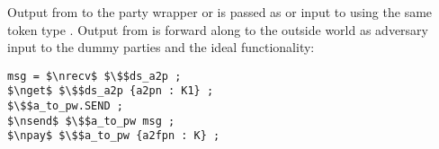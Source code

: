Output from \A to the party wrapper or \F is passed as  or  input to \DS using the same token type .
Output from \DS is forward along to the outside world as adversary input to the dummy parties and the ideal functionality:
\begin{lstlisting}[basicstyle=\footnotesize\BeraMonottFamily, frame=single, mathescape]
msg = $\nrecv$ $\$$ds_a2p ;
$\nget$ $\$$ds_a2p {a2pn : K1} ;
$\$$a_to_pw.SEND ;
$\nsend$ $\$$a_to_pw msg ;
$\npay$ $\$$a_to_pw {a2fpn : K} ;
\end{lstlisting}
